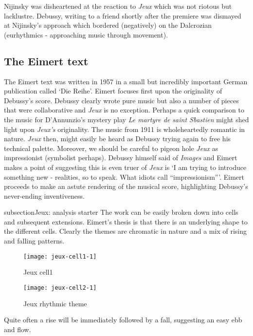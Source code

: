 Nijinsky was disheartened at the reaction to \textit{Jeux} which was not riotous but lacklustre. Debussy, writing to a friend shortly after the premiere was dismayed at Nijinsky's approach which bordered (negatively) on the Dalcrozian (eurhythmics - approaching music through movement). 


\subsection{The Eimert text}
The Eimert text was written in 1957 in a small but incredibly important German publication called `Die Reihe'. Eimert focuses first upon the originality of Debussy's score. Debussy clearly wrote pure music but also a number of pieces that were collaborative and \textit{Jeux} is no exception. Perhaps a quick comparison to the music for D'Annunzio's mystery play \textit{Le martyre de saint S\`bastien} might shed light upon \textit{Jeux's} originality. The music from 1911 is wholeheartedly romantic in nature. \textit{Jeux} then, might easily be heard as Debussy trying again to free his technical palette. Moreover, we should be careful to pigeon hole \textit{Jeux} as impressionist (symbolist perhaps). Debussy himself said of \textit{Images} and Eimert makes a point of suggesting this is even truer of \textit{Jeux} is `I am trying to introduce something new - realities, so to speak. What idiots call ``impressionism'''. Eimert proceeds to make an astute rendering of the musical score, highlighting Debussy's never-ending inventiveness.  

subsection{Jeux: analysis starter}
The work can be easily broken down into cells and subsequent extensions. Eimert's thesis is that there is an underlying shape to the different cells. Clearly the themes are chromatic in nature and a mix of rising and falling patterns. 

\begin{figure}[H]
\centering
\texttt{[image: jeux-cell1-1]}\caption{Jeux cell1}
\label{fig:jeux1}
\end{figure}

\begin{figure}[H]
\centering
\texttt{[image: jeux-cell2-1]}\caption{Jeux rhythmic theme}
\label{fig:jeux2}
\end{figure}

Quite often a rise will be immediately followed by a fall, suggesting an easy ebb and flow.

